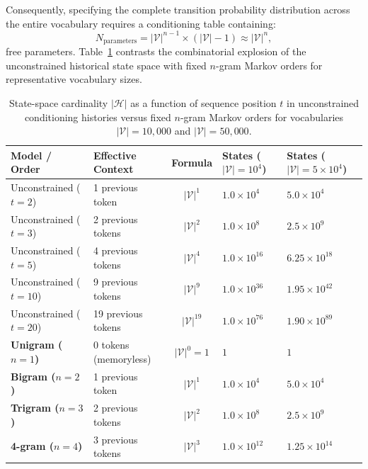 \documentclass[../../../main.tex]{subfiles}
\begin{document}
Consequently, specifying the complete transition probability distribution across the entire vocabulary requires a conditioning table containing:
\begin{equation}
N_{\text{parameters}} = |\mathcal{V}|^{n-1} \times (|\mathcal{V}| - 1) \approx |\mathcal{V}|^n,
\label{eq:parameters_ngram}
\end{equation}
free parameters. Table~\ref{tab:state_space_reduction} contrasts the combinatorial explosion of the unconstrained historical state space with fixed $n$-gram Markov orders for representative vocabulary sizes.

\begin{table}[htbp]
\centering
\small
\begin{tabularx}{\textwidth}{l l c >{\raggedleft\arraybackslash}X >{\raggedleft\arraybackslash}X}
\toprule
\textbf{Model / Order} & \textbf{Effective Context} & \textbf{Formula} & \textbf{States ($|\mathcal{V}| = 10^4$)} & \textbf{States ($|\mathcal{V}| = 5 \times 10^4$)} \\
\midrule
Unconstrained ($t=2$)  & 1 previous token   & $|\mathcal{V}|^1$       & $1.0 \times 10^4$    & $5.0 \times 10^4$    \\
Unconstrained ($t=3$)  & 2 previous tokens  & $|\mathcal{V}|^2$       & $1.0 \times 10^8$    & $2.5 \times 10^9$    \\
Unconstrained ($t=5$)  & 4 previous tokens  & $|\mathcal{V}|^4$       & $1.0 \times 10^{16}$ & $6.25 \times 10^{18}$ \\
Unconstrained ($t=10$) & 9 previous tokens  & $|\mathcal{V}|^9$       & $1.0 \times 10^{36}$ & $1.95 \times 10^{42}$ \\
Unconstrained ($t=20$) & 19 previous tokens & $|\mathcal{V}|^{19}$    & $1.0 \times 10^{76}$ & $1.90 \times 10^{89}$ \\
\midrule
\textbf{Unigram ($n=1$)} & 0 tokens (memoryless) & $|\mathcal{V}|^0 = 1$   & $1$                  & $1$                  \\
\textbf{Bigram ($n=2$)}  & 1 previous token      & $|\mathcal{V}|^1$       & $1.0 \times 10^4$    & $5.0 \times 10^4$    \\
\textbf{Trigram ($n=3$)} & 2 previous tokens     & $|\mathcal{V}|^2$       & $1.0 \times 10^8$    & $2.5 \times 10^9$    \\
\textbf{4-gram ($n=4$)}  & 3 previous tokens     & $|\mathcal{V}|^3$       & $1.0 \times 10^{12}$ & $1.25 \times 10^{14}$ \\
\bottomrule
\end{tabularx}
\caption{State-space cardinality $|\mathcal{H}|$ as a function of sequence position $t$ in unconstrained conditioning histories versus fixed $n$-gram Markov orders for vocabularies $|\mathcal{V}| = 10{,}000$ and $|\mathcal{V}| = 50{,}000$.}
\label{tab:state_space_reduction}
\end{table}
\end{document}
